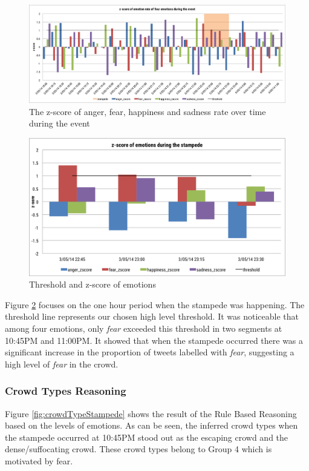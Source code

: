 \begin{figure}[!htb] 
\centering
\includegraphics[width=1.0\linewidth]{EmotionZscoreEvent}
\caption{The z-score of anger, fear, happiness and sadness rate over time during the event}
\label{fig:emotionZscoreEvent}
\end{figure}

\begin{figure}[!htb]
\centering
\includegraphics[width=1.0\textwidth]{EmotionZscoreFocus}
\caption{Threshold and z-score of emotions}
\label{fig:emotionZscoreFocus}
\end{figure}

Figure \ref{fig:emotionZscoreFocus} focuses on the one hour period when the stampede was happening. The threshold line represents our chosen high level threshold. It was noticeable that among four emotions, only \textit{fear} exceeded this threshold in two segments at 10:45PM and 11:00PM. It showed that when the stampede occurred there was a significant increase in the proportion of tweets labelled with \textit{fear}, suggesting a high level of \textit{fear} in the crowd.

\subsubsection{Crowd Types Reasoning}
Figure \ref{fig:crowdTypeStampede} shows the result of the Rule Based Reasoning based on the levels of emotions. As can be seen, the inferred crowd types when the stampede occurred at 10:45PM stood out as the escaping crowd and the dense/suffocating crowd. These crowd types belong to Group 4 which is motivated by fear.

